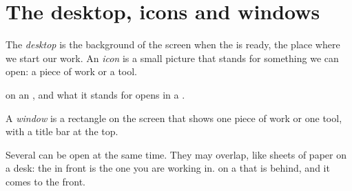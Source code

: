 \section{The desktop, icons and windows}

\begin{definition}\label{def:g2:using-a-computer:desktop}
The \emph{desktop} is the background of the screen when the
 is ready, the place where we start our work. An
\emph{icon} is a small picture that stands for something we can
open: a piece of work or a tool.
\end{definition}

 on an , and what it stands for opens in a .

\begin{definition}[Window]\label{def:g2:using-a-computer:window}
A \emph{window} is a rectangle on the screen that shows one piece of work or
one tool, with a title bar at the top.
\end{definition}

Several  can be open at the same time. They may overlap, like sheets
of paper on a desk: the  in front is the one you are working in. 
on a  that is behind, and it comes to the front.

